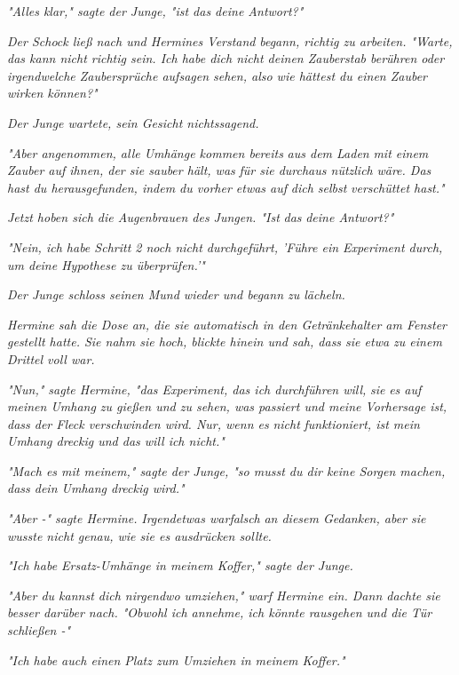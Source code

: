 {\emph{"Alles klar," sagte der Junge, "ist das deine Antwort?"}

\emph{Der Schock ließ nach und Hermines Verstand} \emph{begann, richtig zu arbeiten. "Warte, das kann nicht richtig sein. Ich habe dich nicht deinen Zauberstab berühren oder irgendwelche Zaubersprüche aufsagen sehen, also wie hättest du einen Zauber wirken können?"}

\emph{Der Junge wartete, sein Gesicht nichtssagend.}

\emph{"Aber angenommen, alle Umhänge kommen bereits} \emph{\emph{aus dem Laden}} \emph{mit einem Zauber auf ihnen, der sie sauber hält, was} \emph{für sie durchaus nützlich} \emph{wäre. Das hast du herausgefunden, indem du vorher etwas auf} \emph{\emph{dich selbst}} \emph{verschüttet hast."}

\emph{Jetzt hoben sich die Augenbrauen des Jungen. "Ist} \emph{\emph{das}} \emph{deine Antwort?"}

\emph{"Nein, ich habe Schritt 2 noch nicht durchgeführt, 'Führe ein Experiment durch, um deine Hypothese zu überprüfen.'"}

\emph{Der Junge schloss seinen Mund wieder und begann zu lächeln.}

\emph{Hermine sah die Dose an, die sie automatisch in den Getränkehalter am Fenster gestellt hatte. Sie nahm sie hoch, blickte hinein und sah, dass sie etwa zu einem Drittel voll war.}

\emph{"Nun," sagte Hermine, "das Experiment, das ich durchführen will,} \emph{sie} \emph{es auf meinen Umhang zu gießen und zu sehen, was passiert und meine Vorhersage ist, dass der Fleck verschwinden wird. Nur, wenn es} \emph{\emph{nicht}} \emph{funktioniert, ist mein Umhang dreckig und das will ich nicht."}

\emph{"Mach es mit meinem," sagte der Junge, "so musst du dir keine Sorgen machen, dass dein Umhang dreckig wird."}

\emph{"Aber -" sagte Hermine.} \emph{Irgendetwas war\emph{falsch}} \emph{an diesem Gedanken, aber sie wusste nicht genau, wie sie es ausdrücken sollte.}

\emph{"Ich habe Ersatz-Umhänge in meinem Koffer," sagte der Junge.}

\emph{"Aber du kannst dich nirgendwo umziehen," warf Hermine ein. Dann dachte sie besser darüber nach. "Obwohl ich annehme, ich könnte rausgehen und die Tür schließen -"}

\emph{"Ich habe auch einen Platz zum Umziehen in meinem Koffer."}

}

